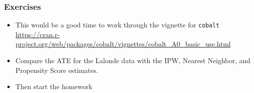 \documentclass[xcolor=pdftex,dvipsnames,table,mathserif,aspectratio=169]{beamer}
\begin{document}
\begin{frame}
\frametitle{Exercises}
\begin{itemize}
\item This would be a good time to work through the vignette for \texttt{cobalt}
 \url{https://cran.r-project.org/web/packages/cobalt/vignettes/cobalt_A0_basic_use.html}
 \item Compare the ATE for the Lalonde data with the IPW, Nearest Neighbor, and Propensity Score estimates.
 \item Then start the homework
\end{itemize}
\end{frame}
\end{document}
